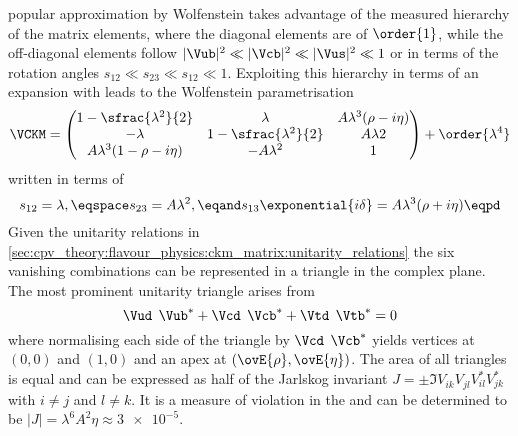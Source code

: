 popular approximation by Wolfenstein takes advantage of the measured hierarchy
of the matrix elements, where the diagonal elements are of $\order{1}$, while
the off-diagonal elements follow $\vert\Vub\vert^2 \ll \vert\Vcb\vert^2 \ll
\vert\Vus\vert^2 \ll 1$ or in terms of the rotation angles $s_{12} \ll s_{23}
\ll s_{12} \ll 1$. Exploiting this hierarchy in terms of an expansion with leads
to the Wolfenstein parametrisation
%
\begin{equation}  
  \VCKM = \begin{pmatrix}
    1 - \sfrac{\lambda^2}{2}        & \lambda                     & A \lambda^3 (\rho - i\eta)  \\
    -\lambda                        & 1 - \sfrac{\lambda^2}{2}    & A \lambda  2                \\
    A \lambda^3 (1 - \rho - i\eta)  & - A \lambda^2               & 1                           \\
  \end{pmatrix}
  + \order{\lambda^4}
\end{equation}
%
written in terms of
%
\begin{equation}
  s_{12} = \lambda, \eqspace s_{23} = A \lambda^2, \eqand s_{13}\exponential{i\delta} = A \lambda^3 (\rho + i \eta) \eqpd
\end{equation}
%
Given the unitarity relations in
\cref{sec:cpv_theory:flavour_physics:ckm_matrix:unitarity_relations} the six
vanishing combinations can be represented in a triangle in the complex plane.
The most prominent unitarity triangle arises from
%
\begin{equation}
  \Vud^{\phantom{\ast}}\Vub^{\ast} + \Vcd^{\phantom{\ast}}\Vcb^{\ast} + \Vtd^{\phantom{\ast}}\Vtb^{\ast} = 0 
\end{equation}
%
where normalising each side of the triangle by
$\Vcd^{\phantom{\ast}}\Vcb^{\ast}$ yields vertices at ${(0,0)}$ and ${(1,0)}$
and an apex at ${(\ovE{\rho},\ovE{\eta})}$. The area of all triangles is equal
and can be expressed as half of the Jarlskog invariant $J = \pm \Im
V_{ik}^{\phantom{\ast}} V_{jl}^{\phantom{\ast}} V_{il}^{\ast} V_{jk}^{\ast}$
with $i \neq j$ and $l \neq k$. It is a measure of \CP violation in the \SM and
can be determined to be $\vert J \vert = \lambda^6 A^2 \eta \approx \num{3e-5}$.

